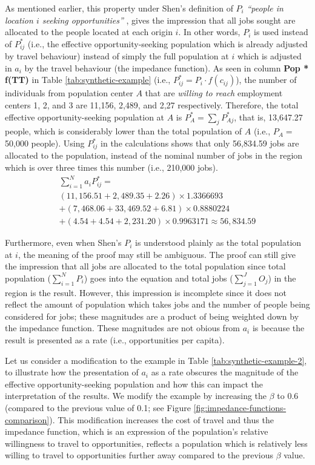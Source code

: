 \documentclass[]{elsarticle} %
\begin{document}
As mentioned earlier, this property under Shen's definition of \(P_i\)
\emph{``people in location \(i\) seeking opportunities''} , gives the
impression that all jobs sought are allocated to the people located at
each origin \(i\). In other words, \(P_i\) is used instead of
\(P_{ij}^*\) (i.e., the effective opportunity-seeking population which
is already adjusted by travel behaviour) instead of simply the full
population at \(i\) which is adjusted in \(a_i\) by the travel behaviour
(the impedance function). As seen in column \textbf{Pop * f(TT)} in
Table \ref{tab:synthetic-example} (i.e.,
\(P_{ij}^* = P_i\cdot f(c_{ij})\)), the number of individuals from
population center \(A\) that are \emph{willing to reach} employment
centers 1, 2, and 3 are 11,156, 2,489, and 2,27 respectively. Therefore,
the total effective opportunity-seeking population at \(A\) is
\(P_A^* = \sum_jP_{Aj}^*\), that is, 13,647.27 people, which is
considerably lower than the total population of \(A\) (i.e., \(P_A=\)
50,000 people). Using \(P_{ij}^*\) in the calculations shows that only
56,834.59 jobs are allocated to the population, instead of the nominal
number of jobs in the region which is over three times this number
(i.e., 210,000 jobs). \[
\begin{array}{l}
\sum_{i=1}^N a_{i} P_{ij}^* =\\
(11,156.51 + 2,489.35 + 2.26)\times 1.3366693 \\
+ (7,468.06 + 33,469.52 + 6.81)\times 0.8880224\\
+ (4.54 + 4.54 + 2,231.20)\times 0.9963171 \approx 56,834.59
\end{array}
\]

Furthermore, even when Shen's \(P_i\) is understood plainly as the total
population at \(i\), the meaning of the proof may still be ambiguous.
The proof can still give the impression that all jobs are allocated to
the total population since total population (\(\sum_{i=1}^N P_i\)) goes
into the equation and total jobs (\(\sum_{j=1}^JO_j\)) in the region is
the result. However, this impression is incomplete since it does not
reflect the amount of population which takes jobs and the number of
people being considered for jobs; these magnitudes are a product of
being weighted down by the impedance function. These magnitudes are not
obious from \(a_i\) is because the result is presented as a rate (i.e.,
opportunities per capita).

Let us consider a modification to the example in Table
\ref{tab:synthetic-example-2}, to illustrate how the presentation of
\(a_i\) as a rate obscures the magnitude of the effective
opportunity-seeking population and how this can impact the
interpretation of the results. We modify the example by increasing the
\(\beta\) to 0.6 (compared to the previous value of 0.1; see Figure
\ref{fig:impedance-functions-comparison}). This modification increases
the cost of travel and thus the impedance function, which is an
expression of the population's relative willingness to travel to
opportunities, reflects a population which is relatively less willing to
travel to opportunities further away compared to the previous \(\beta\)
value.
\end{document}
